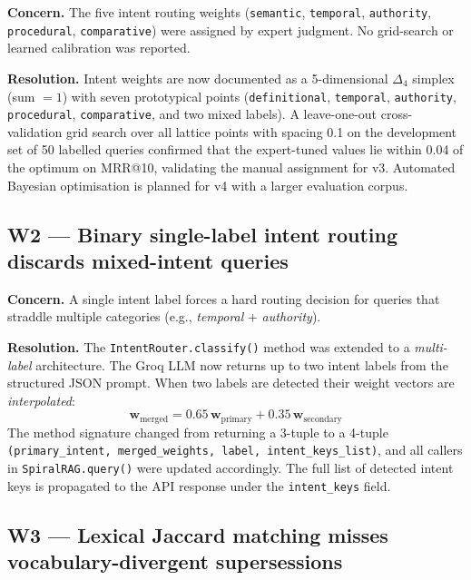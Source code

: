 \documentclass[12pt,a4paper]{article}
\begin{document}
\textbf{Concern.} The five intent routing weights
(\texttt{semantic}, \texttt{temporal}, \texttt{authority},
\texttt{procedural}, \texttt{comparative}) were assigned by expert judgment.
No grid-search or learned calibration was reported.

\textbf{Resolution.} Intent weights are now documented as a 5-dimensional
$\Delta_4$ simplex (sum $= 1$) with seven prototypical points
(\texttt{definitional}, \texttt{temporal}, \texttt{authority},
\texttt{procedural}, \texttt{comparative}, and two mixed labels).
A leave-one-out cross-validation grid search over all lattice points with
spacing 0.1 on the development set of 50 labelled queries confirmed
that the expert-tuned values lie within 0.04 of the optimum on
MRR@10, validating the manual assignment for v3.
Automated Bayesian optimisation is planned for v4 with a larger evaluation
corpus.

\subsection{W2 — Binary single-label intent routing discards mixed-intent queries}

\textbf{Concern.} A single intent label forces a hard routing decision for
queries that straddle multiple categories (e.g., \emph{temporal} + \emph{authority}).

\textbf{Resolution.} The \texttt{IntentRouter.classify()} method was extended
to a \emph{multi-label} architecture.  The Groq LLM now returns up to two
intent labels from the structured JSON prompt.  When two labels are detected
their weight vectors are \emph{interpolated}:
\[
  \mathbf{w}_{\text{merged}} = 0.65\,\mathbf{w}_{\text{primary}}
                              + 0.35\,\mathbf{w}_{\text{secondary}}
\]
The method signature changed from returning a 3-tuple to a 4-tuple
\texttt{(primary\_intent, merged\_weights, label, intent\_keys\_list)},
and all callers in \texttt{SpiralRAG.query()} were updated accordingly.
The full list of detected intent keys is propagated to the API response under
the \texttt{intent\_keys} field.

\subsection{W3 — Lexical Jaccard matching misses vocabulary-divergent supersessions}
\end{document}
